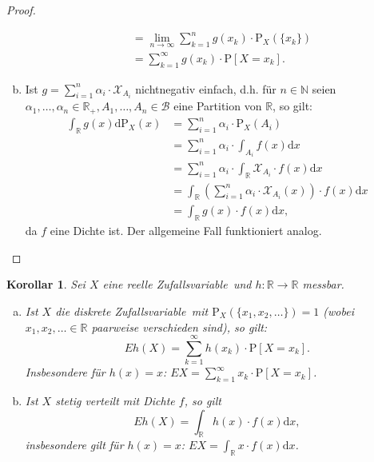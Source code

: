 \documentclass[a4paper,12pt,fleqn]{scrartcl}
\newcommand{\N}{\mathbb{N}}
\newcommand{\R}{\mathbb{R}}
\newcommand{\m}[1]{\mathcal{ #1 }}
\newcommand{\ZV}{Zufallsvariable}
\theoremstyle{definition}
\theoremstyle{plain}
\newtheorem{korollar}[definition]{Korollar}
\theoremstyle{remark}
\begin{document}
\begin{proof}
\begin{enumerate}[a)]
\begin{align*}
&= \lim_{n \rightarrow \infty} \sum_{k=1}^n g(x_k) \cdot \text{P}_X(\{x_k\}) \\
&= \sum_{k=1}^\infty g(x_k) \cdot \text{P}[X=x_k].
\end{align*}
\item Ist $g = \sum_{i=1}^n \alpha_i \cdot \m{X}_{A_i}$ nichtnegativ einfach, d.h. für $n \in \N$ seien $\alpha_1, \ldots, \alpha_n \in \R_+, A_1, \ldots, A_n \in \m{B}$ eine Partition von $\R$, so gilt:
\begin{align*}
\int_\R g(x) \mathrm{d}\text{P}_X(x) &= \sum_{i=1}^n \alpha_i \cdot \text{P}_X(A_i) \\
&= \sum_{i=1}^n \alpha_i \cdot \int_{A_i} f(x) \mathrm{d}x \\
&= \sum_{i=1}^n \alpha_i \cdot \int_{\R} \m{X}_{A_i} \cdot f(x) \mathrm{d}x \\
&= \int_\R (\sum_{i=1}^n \alpha_i \cdot \m{X}_{A_i} (x)) \cdot f(x) \mathrm{d}x \\
&= \int_\R g(x) \cdot f(x) \mathrm{d}x,
\end{align*}
da $f$ eine Dichte ist. Der allgemeine Fall funktioniert analog.
\end{enumerate}
\end{proof}
\begin{korollar}
Sei $X$ eine reelle \ZV \, und $h: \R \rightarrow \R$ messbar.
\begin{enumerate}[a)]
\item Ist $X$ die diskrete \ZV \, mit $\text{P}_X(\{x_1, x_2, \ldots\}) = 1$ (wobei $x_1, x_2, \ldots \in \R$ paarweise verschieden sind), so gilt:
\[Eh(X) = \sum_{k=1}^\infty h(x_k) \cdot \text{P}[X=x_k].\]
Insbesondere für $h(x)=x$: $EX = \sum_{k=1}^\infty x_k \cdot \text{P}[X=x_k]$.
\item Ist $X$ stetig verteilt mit Dichte $f$, so gilt
\[Eh(X) = \int_\R h(x) \cdot f(x) \mathrm{d}x,\]
insbesondere gilt für $h(x)=x$: $EX = \int_\R x \cdot f(x) \mathrm{d}x$.
\end{enumerate}
\end{korollar}
\end{document}
